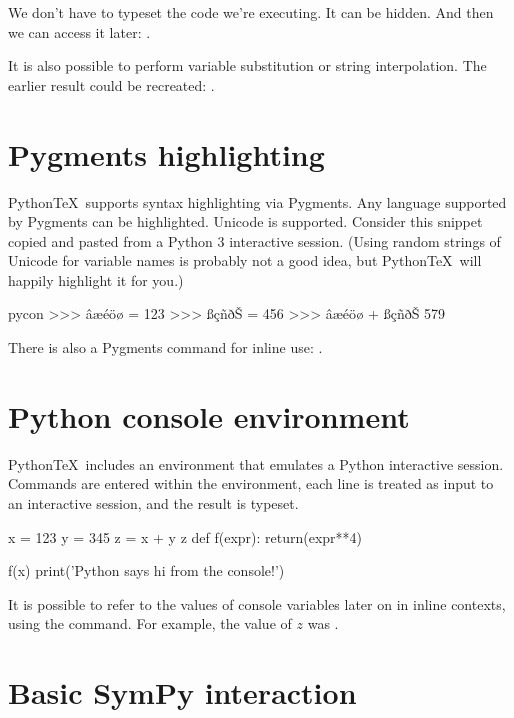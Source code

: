 \documentclass[11pt]{article}
\newcommand{\pytex}{Python\TeX}
\begin{document}
We don't have to typeset the code we're executing.  It can be hidden. And then we can access it later:  .

It is also possible to perform variable substitution or string interpolation.  The earlier result could be recreated:  .


\section{Pygments highlighting}

\pytex\ supports syntax highlighting via Pygments.  Any language supported by Pygments can be highlighted.  Unicode is supported.  Consider this snippet copied and pasted from a Python 3 interactive session.  (Using random strings of Unicode for variable names is probably not a good idea, but \pytex\ will happily highlight it for you.)

\begin{pygments}{pycon}
>>> âæéöø = 123
>>> ßçñðŠ = 456
>>> âæéöø + ßçñðŠ
579
\end{pygments}

There is also a Pygments command for inline use:  .


\section{Python console environment}

\pytex\ includes an environment that emulates a Python interactive session.  Commands are entered within the environment, each line is treated as input to an interactive session, and the result is typeset.

\begin{pyconsole}[][frame=single]
x = 123
y = 345
z = x + y
z
def f(expr):
    return(expr**4)

f(x)
print('Python says hi from the console!')
\end{pyconsole}

It is possible to refer to the values of console variables later on in inline contexts, using the  command.  For example, the value of $z$ was .


\section{Basic SymPy interaction}
\end{document}
